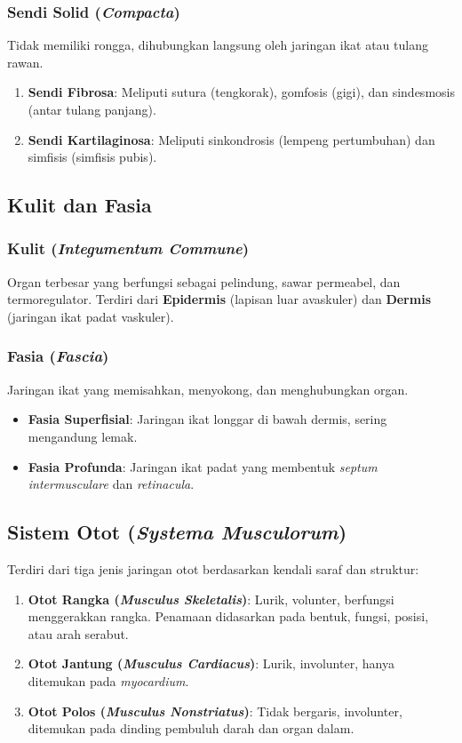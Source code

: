 \subsubsection{Sendi Solid (\textit{Compacta})}
Tidak memiliki rongga, dihubungkan langsung oleh jaringan ikat atau tulang rawan.
\begin{enumerate}
    \item \textbf{Sendi Fibrosa}: Meliputi sutura (tengkorak), gomfosis (gigi), dan sindesmosis (antar tulang panjang).
    \item \textbf{Sendi Kartilaginosa}: Meliputi sinkondrosis (lempeng pertumbuhan) dan simfisis (simfisis pubis).
\end{enumerate}

\subsection{Kulit dan Fasia}
\label{subsec:kulit_fasia}

\subsubsection{Kulit (\textit{Integumentum Commune})}
Organ terbesar yang berfungsi sebagai pelindung, sawar permeabel, dan termoregulator. Terdiri dari \textbf{Epidermis} (lapisan luar avaskuler) dan \textbf{Dermis} (jaringan ikat padat vaskuler).


\subsubsection{Fasia (\textit{Fascia})}
Jaringan ikat yang memisahkan, menyokong, dan menghubungkan organ.
\begin{itemize}
    \item \textbf{Fasia Superfisial}: Jaringan ikat longgar di bawah dermis, sering mengandung lemak.
    \item \textbf{Fasia Profunda}: Jaringan ikat padat yang membentuk \textit{septum intermusculare} dan \textit{retinacula}.
\end{itemize}

\subsection[Sistem Otot (Systema Musculorum)]{Sistem Otot (\textit{Systema Musculorum})}
\label{subsec:sistem_otot}

Terdiri dari tiga jenis jaringan otot berdasarkan kendali saraf dan struktur:
\begin{enumerate}
    \item \textbf{Otot Rangka (\textit{Musculus Skeletalis})}: Lurik, volunter, berfungsi menggerakkan rangka. Penamaan didasarkan pada bentuk, fungsi, posisi, atau arah serabut.
    \item \textbf{Otot Jantung (\textit{Musculus Cardiacus})}: Lurik, involunter, hanya ditemukan pada \textit{myocardium}.
    \item \textbf{Otot Polos (\textit{Musculus Nonstriatus})}: Tidak bergaris, involunter, ditemukan pada dinding pembuluh darah dan organ dalam.
\end{enumerate}

